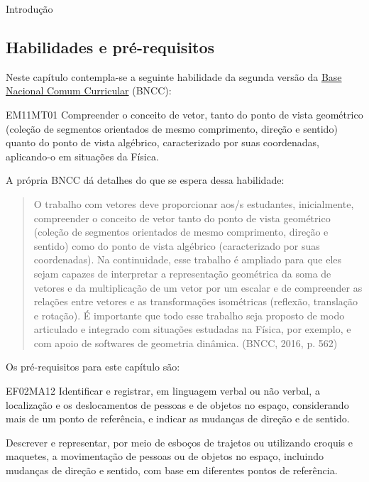 \mainmatter


\begin{apresentacao}{Introdução}

\subsection{Habilidades e pré-requisitos}

Neste capítulo contempla-se a seguinte habilidade da segunda versão da \href{http://historiadabncc.mec.gov.br/documentos/bncc-2versao.revista.pdf}{Base Nacional Comum Curricular} (BNCC):

\begin{habilities}{EM11MT01}
Compreender o conceito de vetor, tanto do ponto de vista geométrico (coleção de segmentos orientados de mesmo comprimento, direção e sentido) quanto do ponto de vista algébrico, caracterizado por suas coordenadas, aplicando-o em situações da Física.
\end{habilities}

A própria BNCC dá detalhes do que se espera dessa habilidade:
\begin{quote}

O trabalho com vetores deve proporcionar aos/s estudantes, inicialmente, compreender o conceito de vetor tanto do ponto de vista geométrico (coleção de segmentos orientados de mesmo comprimento, direção e sentido) como do ponto de vista algébrico (caracterizado por suas coordenadas). Na continuidade, esse trabalho é ampliado para que eles sejam capazes de interpretar a representação geométrica da soma de vetores e da multiplicação de um vetor por um escalar e de compreender as relações entre vetores e as transformações isométricas (reflexão, translação e rotação). É importante que todo esse trabalho seja proposto de modo articulado e integrado com situações estudadas na Física, por exemplo, e com apoio de softwares de geometria dinâmica. (BNCC, 2016, p. 562)
\end{quote}

Os pré-requisitos para este capítulo são:
\begin{habilities}{EF02MA12} Identificar e registrar, em linguagem verbal ou não verbal, a localização e os deslocamentos de pessoas e de objetos no espaço, considerando mais de um ponto de referência, e indicar as mudanças de direção e de sentido.

 Descrever e representar, por meio de esboços de trajetos ou utilizando croquis e maquetes, a movimentação de pessoas ou de objetos no espaço, incluindo mudanças de direção e sentido, com base em diferentes pontos de referência.


\end{habilities}
\end{apresentacao}
